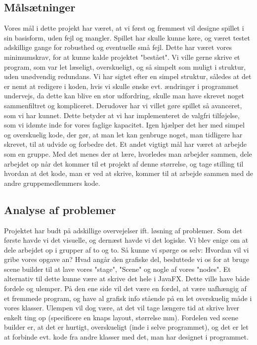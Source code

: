 \subsection{Målsætninger}
Vores mål i dette projekt har været, at vi først og fremmest vil designe spillet i sin basisform, uden fejl og mangler. Spillet har skulle kunne køre, og været testet adskillige gange for robusthed og eventuelle små fejl. Dette har været vores minimumskrav, for at kunne kalde projektet "bestået".
Vi ville gerne skrive et program, som var let læseligt, overskueligt, og så simpelt som muligt i struktur, uden unødvendig redundans. Vi har sigtet efter en simpel struktur, således at det er nemt at redigere i koden, hvis vi skulle ønske evt. ændringer i programmet undervejs, da dette kan blive en stor udfordring, skulle man have skrevet noget sammenfiltret og kompliceret. 
Derudover har vi villet gøre spillet så avanceret, som vi har kunnet. Dette betyder at vi har implementeret de valgfri tilføjelse, som vi idømte inde for vores faglige kapacitet. Igen hjælper det her med simpel og overskuelig kode, der gør, at man let kan genbruge noget, man tidligere har skrevet, til at udvide og forbedre det.  
Et andet vigtigt mål har været at arbejde som en gruppe. Med det menes der at lære, hvorledes man arbejder sammen, dele arbejdet op når det kommer til et projekt af denne størrelse, og tage stilling til hvordan at det kode, man er ved at skrive, kommer til at arbejde sammen med de andre gruppemedlemmers kode. 

\subsection{Analyse af problemer}
Projektet har budt på adskillige overvejelser ift. løsning af problemer. Som det første havde vi det visuelle, og dernæst havde vi det logiske. Vi blev enige om at dele arbejdet op i grupper af to og to. Så kunne vi spørge os selv: Hvordan vil vi gribe vores opgave an? Hvad angår den grafiske del, besluttede vi os for at bruge scene builder til at lave vores "stage", "Scene" og nogle af vores "nodes". Et alternativ til dette kunne være at skrive det hele i JavaFX. Dette ville have både fordele og ulemper. På den ene side vil det være en fordel, at være uafhængig af et fremmede program, og have al grafisk info stående på en let overskuelig måde i vores klasser. Ulempen vil dog være, at det vil tage længere tid at skrive hver enkelt ting op (specificere en knaps layout, størrelse mm). Fordelen ved scene builder er, at det er hurtigt, overskueligt (inde i selve programmet), og det er let at forbinde evt. kode fra andre klasser med det, man har designet i programmet.

